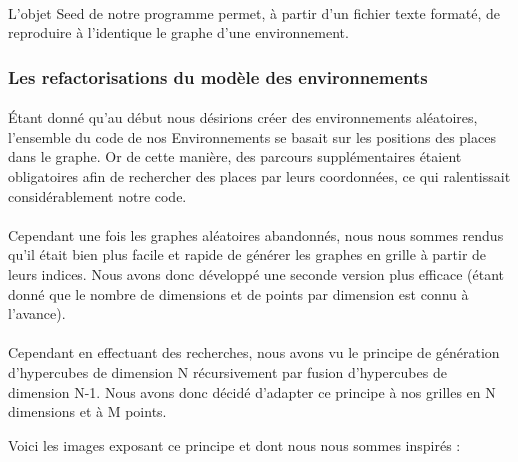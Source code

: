 \documentclass[pidr]{tnreport}
\begin{document}
\paragraph{}
L'objet Seed de notre programme permet, à partir d'un fichier texte formaté, de reproduire à l'identique le graphe d'une environnement.

			\subsubsection{Les refactorisations du modèle des environnements}

\paragraph{}
Étant donné qu'au début nous désirions créer des environnements aléatoires, l'ensemble du code de nos Environnements se basait sur les positions des places dans le graphe. Or de cette manière, des parcours supplémentaires étaient obligatoires afin de rechercher des places par leurs coordonnées, ce qui ralentissait considérablement notre code. 
\paragraph{}
Cependant une fois les graphes aléatoires abandonnés, nous nous sommes rendus qu'il était bien plus facile et rapide de générer les graphes en grille à partir de leurs indices. Nous avons donc développé une seconde version plus efficace (étant donné que le nombre de dimensions et de points par dimension est connu à l'avance).
\paragraph{}
Cependant en effectuant des recherches, nous avons vu le principe de génération d'hypercubes de dimension N récursivement par fusion d'hypercubes de dimension N-1. Nous avons donc décidé d'adapter ce principe à nos grilles en N dimensions et à M points.

Voici les images exposant ce principe et dont nous nous sommes inspirés : 
\end{document}
